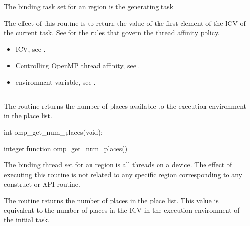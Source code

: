 \binding
The binding task set for an  region is the generating task

\effect
The effect of this routine is to return the value of the first element 
of the  ICV of the current task. See 
 for the rules that
govern the thread affinity policy.

\crossreferences
\begin{itemize}
\item {} ICV, see
.

\item Controlling OpenMP thread affinity, see
.

\item {} environment variable, see
.
\end{itemize}



\subsection{}
\label{subsec:omp_get_num_places}
\summary
The  routine returns the number of places
available to the execution environment in the place list.

\format
\begin{ccppspecific}
\begin{ompcFunction}
int omp_get_num_places(void);
\end{ompcFunction}
\end{ccppspecific}

\begin{fortranspecific}
\begin{ompfFunction}
integer function omp_get_num_places()
\end{ompfFunction}
\end{fortranspecific}

\binding
The binding thread set for an   region is 
all threads on a device. The effect of executing this routine is not 
related to any specific region corresponding to any construct or API routine.

\effect

The  routine returns the number of places in 
the place list. This value is equivalent to the number of places in the 
  ICV in the execution environment of the initial task.

